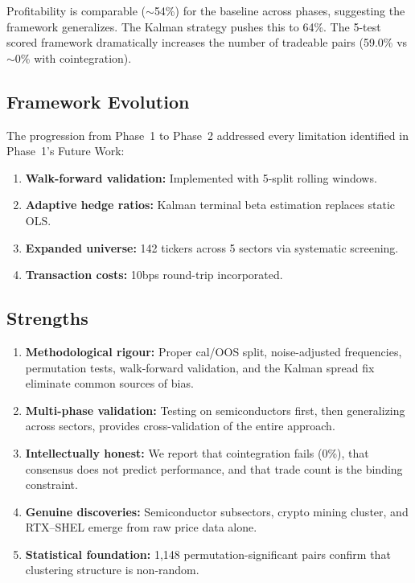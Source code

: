 \documentclass[11pt, a4paper]{article}
\begin{document}
Profitability is comparable ($\sim$54\%) for the baseline across phases, suggesting the framework generalizes. The Kalman strategy pushes this to 64\%. The 5-test scored framework dramatically increases the number of tradeable pairs (59.0\% vs $\sim$0\% with cointegration).

\subsection{Framework Evolution}

The progression from Phase~1 to Phase~2 addressed every limitation identified in Phase~1's Future Work:

\begin{enumerate}
    \item \textbf{Walk-forward validation:} Implemented with 5-split rolling windows.
    \item \textbf{Adaptive hedge ratios:} Kalman terminal beta estimation replaces static OLS.
    \item \textbf{Expanded universe:} 142 tickers across 5 sectors via systematic screening.
    \item \textbf{Transaction costs:} 10bps round-trip incorporated.
\end{enumerate}

\subsection{Strengths}

\begin{enumerate}
    \item \textbf{Methodological rigour:} Proper cal/OOS split, noise-adjusted frequencies, permutation tests, walk-forward validation, and the Kalman spread fix eliminate common sources of bias.
    \item \textbf{Multi-phase validation:} Testing on semiconductors first, then generalizing across sectors, provides cross-validation of the entire approach.
    \item \textbf{Intellectually honest:} We report that cointegration fails (0\%), that consensus does not predict performance, and that trade count is the binding constraint.
    \item \textbf{Genuine discoveries:} Semiconductor subsectors, crypto mining cluster, and RTX--SHEL emerge from raw price data alone.
    \item \textbf{Statistical foundation:} 1,148 permutation-significant pairs confirm that clustering structure is non-random.
\end{enumerate}
\end{document}

